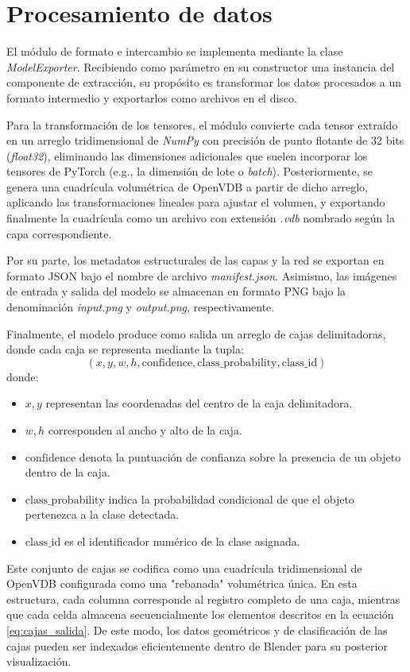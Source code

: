 \section{Procesamiento de datos}
El módulo de formato e intercambio se implementa mediante la clase \textit{ModelExporter}. 
Recibiendo como parámetro en su constructor una instancia del componente de extracción, su propósito es 
transformar los datos procesados a un formato intermedio y exportarlos como archivos en el disco.
\medskip

Para la transformación de los tensores, el módulo convierte cada tensor extraído en un arreglo 
tridimensional de \textit{NumPy} con precisión de punto flotante de 32 bits (\textit{float32}), 
eliminando las dimensiones adicionales que suelen incorporar los tensores de PyTorch (e.g., la 
dimensión de lote o \textit{batch}). Posteriormente, se genera una cuadrícula volumétrica de OpenVDB 
a partir de dicho arreglo, aplicando las transformaciones lineales para ajustar el volumen, 
y exportando finalmente la cuadrícula como un archivo con extensión \textit{.vdb} nombrado según la capa correspondiente.
\medskip

Por su parte, los metadatos estructurales de las capas y la red se exportan en formato JSON bajo el nombre 
de archivo \textit{manifest.json}. Asimismo, las imágenes de entrada y salida del modelo se almacenan en 
formato PNG bajo la denominación \textit{input.png} y \textit{output.png}, respectivamente.
\medskip

Finalmente, el modelo produce como salida un arreglo de cajas delimitadoras, donde cada caja se representa 
mediante la tupla:
\begin{equation}\label{eq:cajas_salida}
    (x, y, w, h, \text{confidence}, \text{class\_probability}, \text{class\_id})
\end{equation}
donde:
\begin{itemize}
    \item $x, y$ representan las coordenadas del centro de la caja delimitadora.
    \item $w, h$ corresponden al ancho y alto de la caja.
    \item $\text{confidence}$ denota la puntuación de confianza sobre la presencia de un objeto dentro de 
    la caja.
    \item $\text{class\_probability}$ indica la probabilidad condicional de que el objeto pertenezca a la 
    clase detectada.
    \item $\text{class\_id}$ es el identificador numérico de la clase asignada.
\end{itemize}

Este conjunto de cajas se codifica como una cuadrícula tridimensional de OpenVDB configurada como una 
"rebanada" volumétrica única. En esta estructura, cada columna corresponde al registro completo de una 
caja, mientras que cada celda almacena secuencialmente los elementos descritos en la ecuación 
\eqref{eq:cajas_salida}. De este modo, los datos geométricos y de clasificación de las cajas pueden ser 
indexados eficientemente dentro de Blender para su posterior visualización.